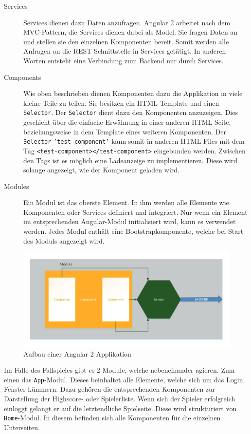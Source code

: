 \begin{description}
	\item[Services] Services dienen dazu Daten anzufragen. Angular 2 arbeitet nach dem \ac{MVC}-Pattern, die Services dienen dabei als Model. Sie fragen Daten an und stellen sie den einzelnen Komponenten bereit. Somit werden alle Anfragen an die REST Schnittstelle in Services getätigt. In anderen Worten entsteht eine Verbindung zum Backend nur durch Services.
	\item[Components] Wie oben beschrieben dienen Komponenten dazu die Applikation in viele kleine Teile zu teilen. Sie besitzen ein HTML Template und einen \texttt{Selector}. Der \texttt{Selector} dient dazu den Komponenten anzuzeigen. Dies geschieht über die einfache Erwähnung in einer anderen HTML Seite, beziehungsweise in dem Template eines weiteren Komponenten. Der \texttt{Selector} \texttt{'test-component'} kann somit in anderen HTML Files mit dem Tag \texttt{<test-component></test-component>} eingebunden werden. Zwischen den Tags ist es möglich eine Ladeanzeige zu implementieren. Diese wird solange angezeigt, wie der Komponent geladen wird.
	\item[Modules] Ein Modul ist das oberste Element. In ihm werden alle Elemente wie Komponenten oder Services definiert und integriert. Nur wenn ein Element im entsprechenden Angular-Modul initialisiert wird, kann es verwendet werden. Jedes Modul enthält eine Bootstrapkomponente, welche bei Start des Moduls angezeigt wird.
\end{description}

\begin{figure}[h]
	\centering	\includegraphics[width=\textwidth]{img/angular2_aufbau}
	\captionsetup{format=hang}
	\caption{
		\label{abb:angular2}Aufbau einer Angular 2 Applikation}
\end{figure}

Im Falle des Fallspieles gibt es 2 Module, welche nebeneinander agieren. Zum einen das \texttt{App}-Modul. Dieses beinhaltet alle Elemente, welche sich um das Login Fenster kümmern. Dazu gehören die entsprechenden Komponenten zur Darstellung der Highscore- oder Spielerliste. Wenn sich der Spieler erfolgreich einloggt gelangt er auf die letztendliche Spielseite. Diese wird strukturiert von \texttt{Home}-Modul. In diesem befinden sich alle Komponenten für die einzelnen Unterseiten.

